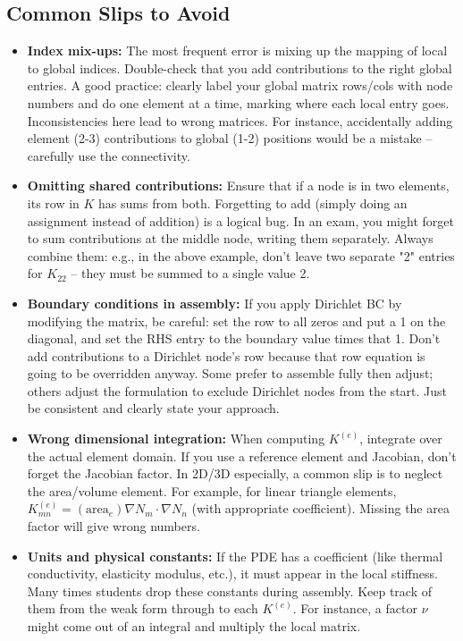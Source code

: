 \documentclass[a4paper,11pt]{report}
\begin{document}
\subsection{Common Slips to Avoid}

\begin{itemize}
    \item \textbf{Index mix-ups:} The most frequent error is mixing up the mapping of local to global indices. Double-check that you add contributions to the right global entries. A good practice: clearly label your global matrix rows/cols with node numbers and do one element at a time, marking where each local entry goes. Inconsistencies here lead to wrong matrices. For instance, accidentally adding element (2-3) contributions to global (1-2) positions would be a mistake -- carefully use the connectivity.

    \item \textbf{Omitting shared contributions:} Ensure that if a node is in two elements, its row in $K$ has sums from both. Forgetting to add (simply doing an assignment instead of addition) is a logical bug. In an exam, you might forget to sum contributions at the middle node, writing them separately. Always combine them: e.g., in the above example, don't leave two separate "2" entries for $K_{22}$ -- they must be summed to a single value 2.

    \item \textbf{Boundary conditions in assembly:} If you apply Dirichlet BC by modifying the matrix, be careful: set the row to all zeros and put a 1 on the diagonal, and set the RHS entry to the boundary value times that 1. Don't add contributions to a Dirichlet node's row because that row equation is going to be overridden anyway. Some prefer to assemble fully then adjust; others adjust the formulation to exclude Dirichlet nodes from the start. Just be consistent and clearly state your approach.

    \item \textbf{Wrong dimensional integration:} When computing $K^{(e)}$, integrate over the actual element domain. If you use a reference element and Jacobian, don't forget the Jacobian factor. In 2D/3D especially, a common slip is to neglect the area/volume element. For example, for linear triangle elements, $K^{(e)}_{mn} = (\text{area}_e)\nabla N_m \cdot \nabla N_n$ (with appropriate coefficient). Missing the area factor will give wrong numbers.

    \item \textbf{Units and physical constants:} If the PDE has a coefficient (like thermal conductivity, elasticity modulus, etc.), it must appear in the local stiffness. Many times students drop these constants during assembly. Keep track of them from the weak form through to each $K^{(e)}$. For instance, a factor $\nu$ might come out of an integral and multiply the local matrix.


\end{itemize}
\end{document}
